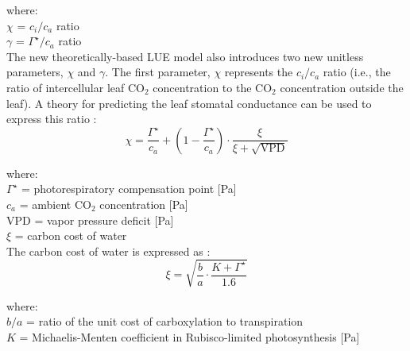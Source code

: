 \noindent where: \\
\indent $\chi$ = $c_{i}/c_{a}$ ratio\\
\indent $\gamma$ = $\Gamma^{\star}/c_{a}$ ratio \\

\noindent The new theoretically-based LUE model also introduces two new unitless parameters, $\chi$ and $\gamma$. 
The first parameter, $\chi$ represents the $c_{i}/c_{a}$ ratio (i.e., the ratio of intercellular leaf CO$_2$ concentration to the CO$_2$ concentration outside the leaf). 
A theory for predicting the leaf stomatal conductance can be used to express this ratio \parencite[Eq. 8]{prentice14}:
%
%
%
\begin{equation}
\label{eq:chi}
    \chi = \frac{\Gamma^{\star}}{c_{a}} + \left(1 - \frac{\Gamma^{\star}}{c_{a}} \right) \cdot \frac{\xi}{\xi + \sqrt{\text{VPD}}} 
\end{equation}

\noindent where:\\
\indent $\Gamma^{\star}$ = photorespiratory compensation point [Pa]\\
\indent $c_{a}$ = ambient CO$_2$ concentration [Pa]\\
\indent VPD = vapor pressure deficit [Pa]\\
\indent $\xi$ = carbon cost of water\\

\noindent The carbon cost of water is expressed as \parencite{prentice14}:
%
\begin{equation}
\label{eq:xi}
    \xi = \sqrt{\frac{b}{a} \cdot \frac{K + \Gamma^{\star}}{1.6}}
\end{equation}

\noindent where: \\
\indent $b/a$ = ratio of the unit cost of carboxylation to transpiration\\
\indent $K$ = Michaelis-Menten coefficient in Rubisco-limited photosynthesis [Pa]\\

